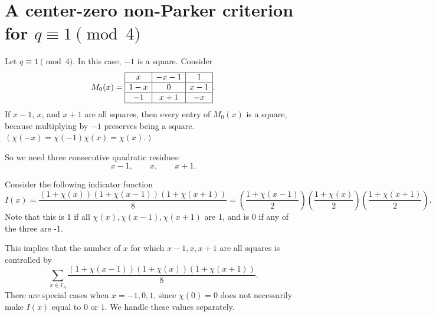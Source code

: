 \documentclass{article}
\newcommand{\p}[1]{\left( #1 \right)}
\newcommand{\F}{\mathbb F}
\theoremstyle{definition}
\numberwithin{equation}{section}
\begin{document}






\section{A center-zero non-Parker criterion for \(q\equiv1\pmod4\)}
\label{sec:center-zero-square}

Let \(q\equiv1\pmod4\). In this case, \(-1\) is a square. Consider
\[
M_0(x)=
\begin{array}{|c|c|c|}
\hline
x & -x-1 & 1\\
\hline
1-x & 0 & x-1\\
\hline
-1 & x+1 & -x \\
\hline
\end{array}.
\]
If \(x-1\), \(x\), and \(x+1\) are all squares, then every entry of \(M_0(x)\)
is a square, because multiplying by \(-1\) preserves being a square. $(\chi(-x)=\chi(-1)\chi(x) = \chi(x).)$

So we need three consecutive quadratic residues:
\[
x-1,
\qquad x,
\qquad x+1.
\]

Consider the following indicator function
\[
I(x)=\frac{(1+\chi(x))(1+\chi(x-1))(1+\chi(x+1))}{8} = \p{\frac{1+\chi(x-1)}{2}}\p{\frac{1+\chi(x)}{2}}\p{\frac{1+\chi(x+1)}{2}}.
\]
Note that this is 1 if all $\chi(x), \chi(x-1), \chi(x+1)$ are 1, and is 0 if any of the three are -1.

This implies that the number of \(x\) for which \(x-1,x,x+1\) are all squares is controlled by
\[
\sum_{x\in\F_q}
\frac{(1+\chi(x-1))(1+\chi(x))(1+\chi(x+1))}{8}.
\]
There are special cases when \(x=-1,0,1\), since \(\chi(0)=0\) does not necessarily make \(I(x)\) equal to \(0\) or \(1\). We handle these values separately.
\end{document}
